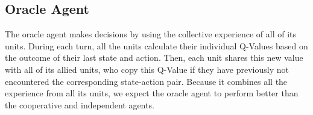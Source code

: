 \subsection{Oracle Agent}\label{Oracle_Agent}

The oracle agent makes decisions by using the collective experience of all of its units. During each turn, all the units calculate their individual Q-Values based on the outcome of their last state and action. Then, each unit shares this new value with all of its allied units, who copy this Q-Value if they have previously not encountered the corresponding state-action pair. Because it combines all the experience from all its units, we expect the oracle agent to perform better than the cooperative and independent agents.

 





  
%
